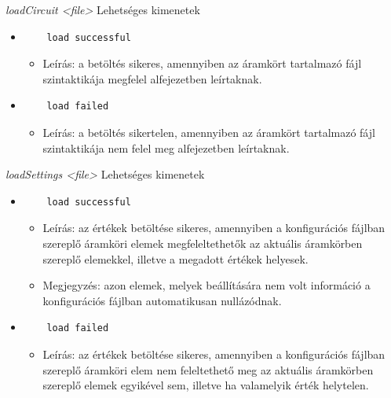 \textit{loadCircuit <file>}\newline
Lehetséges kimenetek
\begin{itemize}
	\item
	\begin{verbatim}
	load successful
	\end{verbatim}
	\begin{itemize}
		\item Leírás: a betöltés sikeres, amennyiben az áramkört tartalmazó fájl szintaktikája megfelel  alfejezetben leírtaknak.
	\end{itemize}
	\item 
	\begin{verbatim}
	load failed
	\end{verbatim}
	\begin{itemize}
		\item Leírás: a betöltés sikertelen, amennyiben az áramkört tartalmazó fájl szintaktikája nem felel meg  alfejezetben leírtaknak.
	\end{itemize}
\end{itemize}

\textit{loadSettings <file>}\newline
Lehetséges kimenetek
\begin{itemize}
	\item
	\begin{verbatim}
	load successful
	\end{verbatim}
	\begin{itemize}
		\item Leírás: az értékek betöltése sikeres, amennyiben a konfigurációs fájlban szereplő áramköri elemek megfeleltethetők az aktuális áramkörben szereplő elemekkel, illetve a megadott értékek helyesek.
		\item Megjegyzés: azon elemek, melyek beállítására nem volt információ a konfigurációs fájlban automatikusan nullázódnak.
	\end{itemize}
	\item
	\begin{verbatim}
	load failed
	\end{verbatim}
	\begin{itemize}
		\item Leírás: az értékek betöltése sikeres, amennyiben a konfigurációs fájlban szereplő áramköri elem nem feleltethető meg az aktuális áramkörben szereplő elemek egyikével sem, illetve ha valamelyik érték helytelen.
	\end{itemize}
\end{itemize}

